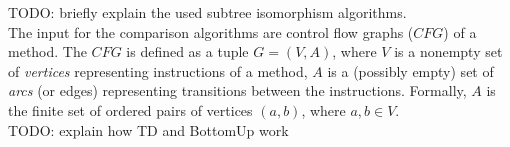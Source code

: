 TODO: briefly explain the used subtree isomorphism algorithms.
\\

The input  for the comparison algorithms are control flow graphs ($CFG$) of a method.
The $CFG$ is defined as a tuple $G=(V, A)$, where  
$V$ is a nonempty set of \textit{vertices} representing instructions of a method,
$A$ is a (possibly empty) set of \textit{arcs} (or edges) representing transitions between the instructions.
Formally, $A$ is the finite set of ordered pairs of vertices $(a, b)$, where $a,b \in V$.
\\

TODO:  explain how TD and BottomUp work
\\







